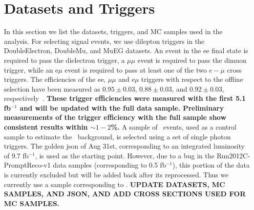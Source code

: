 \clearpage

\section{Datasets and Triggers}
\label{sec:datasets}

In this section we list the datasets, triggers, and MC samples used in the analysis. For selecting signal
events, we use dilepton triggers in the DoubleElectron, DoubleMu, and MuEG datasets. 
An event in the ee final state is required to pass the dielectron trigger, a 
$\mu\mu$ event is required to pass the dimuon trigger, while an e$\mu$ event is required to pass at least one 
of the two $e-\mu$ cross triggers. The efficiencies of the ee, $\mu\mu$ and e$\mu$ triggers with respect to the
offline selection have been measured as $0.95\pm0.03$, $0.88\pm0.03$, and $0.92\pm0.03$, respectively~\cite{ref:SSAN}.  
{\bf These trigger efficiencies were measured with the first 5.1 fb$^{-1}$ and will be updated with the full data sample. Preliminary measurements of the trigger efficiency with the full sample show consistent results within $\sim1-2$\%.}
A sample of \gjets\ events, used as a control sample to estimate the \zjets\
background, is selected using a set of single photon triggers.
The golden json of Aug 31st, corresponding to an integrated luminosity of 9.7 fb$^{-1}$, is used as the starting point.
However, due to a bug in the Run2012C-PromptReco-v1 data samples (corresponding to 0.5 fb$^{-1}$), this portion of the data
is currently excluded but will be added back after its reprocessed. Thus we currently use a sample corresponding to \lumi.
{\bf UPDATE DATASETS, MC SAMPLES, AND JSON, AND ADD CROSS SECTIONS USED FOR MC SAMPLES.}


